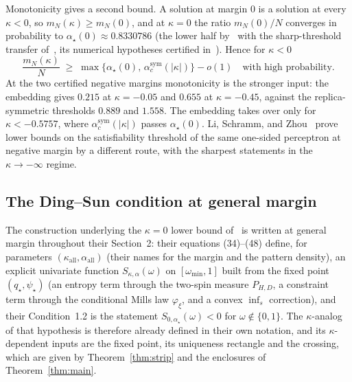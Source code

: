 Monotonicity gives a second bound.  A solution at
margin $0$ is a solution at every $\kappa<0$, so
$m_N(\kappa)\ge m_N(0)$, and at $\kappa=0$ the ratio $m_N(0)/N$
converges in probability to $\alpha_\star(0)\approx0.8330786$ (the
lower half by~\cite{ding2019capacity} with the sharp-threshold
transfer of~\cite{nakajimasun2022}, its numerical hypotheses
certified in~\cite{shmalo2026capacity}).  Hence
for $\kappa<0$
\[
\frac{m_N(\kappa)}{N}\;\ge\;
\max\bigl\{\alpha_\star(0),\,\alpha^{\mathrm{sym}}_c(|\kappa|)\bigr\}
-o(1)\quad\text{with high probability}.
\]
At the two certified negative margins monotonicity is the stronger
input: the embedding gives $0.215$ at $\kappa=-0.05$ and $0.655$ at
$\kappa=-0.45$, against the replica-symmetric thresholds $0.889$ and $1.558$.  The
embedding takes over only for $\kappa<-0.5757$, where
$\alpha^{\mathrm{sym}}_c(|\kappa|)$ passes $\alpha_\star(0)$.  Li,
Schramm, and Zhou~\cite{lsz2024} prove lower bounds on the
satisfiability threshold of the same one-sided perceptron at
negative margin by a different route, with the sharpest statements
in the $\kappa\to-\infty$ regime.

\subsection{The Ding--Sun condition at general margin}

The construction underlying the $\kappa=0$ lower bound
of~\cite{ding2019capacity} is written at general margin throughout
their Section~2: their equations (34)--(48) define, for parameters
$(\kappa_{\mathrm{all}},\alpha_{\mathrm{all}})$ (their names for the
margin and the pattern density), an explicit
univariate function $S_{\kappa,\alpha}(\omega)$ on
$[\omega_{\min},1]$ built from the fixed point $(q_\star,\psi_\star)$
(an entropy term through the two-spin measure $P_{H,D}$, a
constraint term through the conditional Mills law
$\varphi_\xi$, and a convex $\inf_s$ correction), and their
Condition~1.2 is the statement $S_{0,\alpha_\star}(\omega)<0$ for
$\omega\notin\{0,1\}$.  The $\kappa$-analog of that hypothesis is
therefore already defined in their own notation, and its
$\kappa$-dependent inputs are the fixed point, its uniqueness
rectangle and the crossing, which are given by
Theorem~\ref{thm:strip} and the enclosures of
Theorem~\ref{thm:main}.

